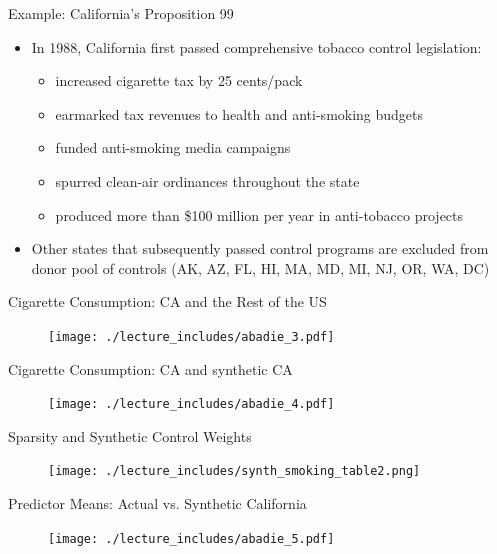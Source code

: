 \documentclass{beamer}
\begin{document}
\begin{frame}{Example: California's Proposition 99}
	
	\begin{itemize}
	\item In 1988, California first passed comprehensive tobacco control legislation:
		\begin{itemize}
		\item increased cigarette tax by 25 cents/pack
		\item earmarked tax revenues to health and anti-smoking budgets
		\item funded anti-smoking media campaigns
		\item spurred clean-air ordinances throughout the state
		\item produced more than \$100 million per year in anti-tobacco projects
		\end{itemize}
	\item Other states that subsequently passed control programs are excluded from donor pool of controls (AK, AZ, FL, HI, MA, MD, MI, NJ, OR, WA, DC)
	\end{itemize}
\end{frame}

\begin{frame}{Cigarette Consumption: CA and the Rest of the US}
	
	\begin{figure}
	\texttt{[image: ./lecture\_includes/abadie\_3.pdf]}
	\end{figure}
\end{frame}

\begin{frame}{Cigarette Consumption: CA and synthetic CA}
	
	\begin{figure}
	\texttt{[image: ./lecture\_includes/abadie\_4.pdf]}
	\end{figure}
\end{frame}

\begin{frame}{Sparsity and Synthetic Control Weights}
	\begin{figure}
	\texttt{[image: ./lecture\_includes/synth\_smoking\_table2.png]}
	\end{figure}
\end{frame}



\begin{frame}{Predictor Means: Actual vs. Synthetic California}
	
	\begin{figure}
	\texttt{[image: ./lecture\_includes/abadie\_5.pdf]}
	\end{figure}
\end{frame}
\end{document}
